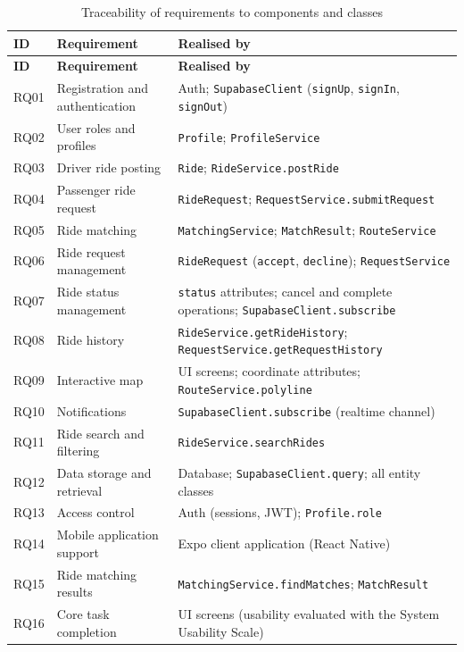 \begingroup\small
\begin{longtable}{@{}>{\raggedright\arraybackslash}p{}
                   >{\raggedright\arraybackslash}p{}
                   >{\raggedright\arraybackslash}p{}@{}}
\caption{Traceability of requirements to components and classes}\label{tab:traceability}\\
\toprule
\textbf{ID} & \textbf{Requirement} & \textbf{Realised by} \\
\midrule
\endfirsthead
\toprule
\textbf{ID} & \textbf{Requirement} & \textbf{Realised by} \\
\midrule
\endhead
\bottomrule
\endfoot
RQ01 & Registration and authentication & Auth; \texttt{SupabaseClient} (\texttt{signUp}, \texttt{signIn}, \texttt{signOut}) \\
RQ02 & User roles and profiles & \texttt{Profile}; \texttt{ProfileService} \\
RQ03 & Driver ride posting & \texttt{Ride}; \texttt{RideService.postRide} \\
RQ04 & Passenger ride request & \texttt{RideRequest}; \texttt{RequestService.submitRequest} \\
RQ05 & Ride matching & \texttt{MatchingService}; \texttt{MatchResult}; \texttt{RouteService} \\
RQ06 & Ride request management & \texttt{RideRequest} (\texttt{accept}, \texttt{decline}); \texttt{RequestService} \\
RQ07 & Ride status management & \texttt{status} attributes; cancel and complete operations; \texttt{SupabaseClient.subscribe} \\
RQ08 & Ride history & \texttt{RideService.getRideHistory}; \texttt{RequestService.getRequestHistory} \\
RQ09 & Interactive map & UI screens; coordinate attributes; \texttt{RouteService.polyline} \\
RQ10 & Notifications & \texttt{SupabaseClient.subscribe} (realtime channel) \\
RQ11 & Ride search and filtering & \texttt{RideService.searchRides} \\
RQ12 & Data storage and retrieval & Database; \texttt{SupabaseClient.query}; all entity classes \\
RQ13 & Access control & Auth (sessions, JWT); \texttt{Profile.role} \\
RQ14 & Mobile application support & Expo client application (React Native) \\
RQ15 & Ride matching results & \texttt{MatchingService.findMatches}; \texttt{MatchResult} \\
RQ16 & Core task completion & UI screens (usability evaluated with the System Usability Scale) \\
\end{longtable}
\endgroup
